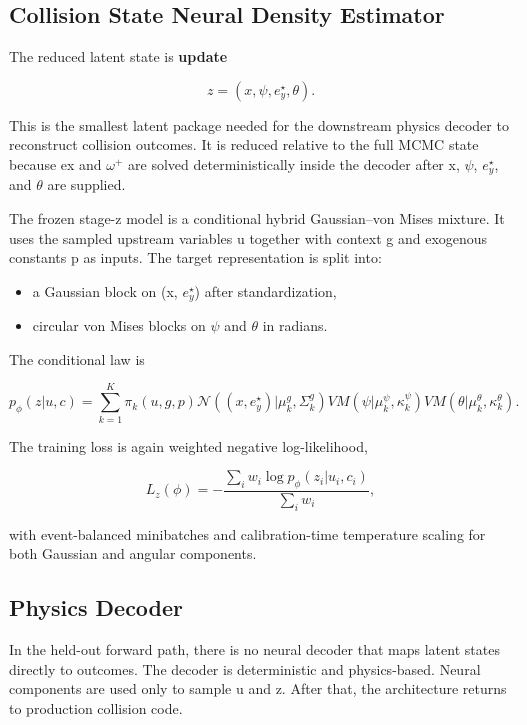 \documentclass[11pt]{article}
\begin{document}
\subsection{Collision State Neural Density Estimator}

The reduced latent state is \textbf{update}

\[
z = (x, \psi, e_y^\star, \theta).
\]

This is the smallest latent package needed for the downstream physics decoder to reconstruct collision outcomes. It is reduced relative to the full MCMC state because ex and \(\omega^+\) are solved deterministically inside the decoder after x, \(\psi\), \(e_y^\star\), and \(\theta\) are supplied.

The frozen stage-z model is a conditional hybrid Gaussian–von Mises mixture. It uses the sampled upstream variables u together with context g and exogenous constants p as inputs. The target representation is split into:

\begin{itemize}
    \item a Gaussian block on (x, \(e_y^\star\)) after standardization,
    \item circular von Mises blocks on \(\psi\) and \(\theta\) in radians.
\end{itemize}

The conditional law is

\begin{equation}
p_\phi(z | u, c)
=
\sum_{k=1}^{K}
\pi_k(u,g,p)
\mathcal{N}
\left(
(x, e_y^\star) | \mu_k^g, \Sigma_k^g
\right)
VM(\psi | \mu_k^\psi, \kappa_k^\psi)
VM(\theta | \mu_k^\theta, \kappa_k^\theta).
\end{equation}

The training loss is again weighted negative log-likelihood,

\begin{equation}
L_z(\phi)
=
-
\frac{
\sum_i w_i \log p_\phi(z_i | u_i, c_i)
}{
\sum_i w_i
},
\end{equation}

with event-balanced minibatches and calibration-time temperature scaling for both Gaussian and angular components.

\subsection{Physics Decoder}

In the held-out forward path, there is no neural decoder that maps latent states directly to outcomes. The decoder is deterministic and physics-based. Neural components are used only to sample u and z. After that, the architecture returns to production collision code.
\end{document}
